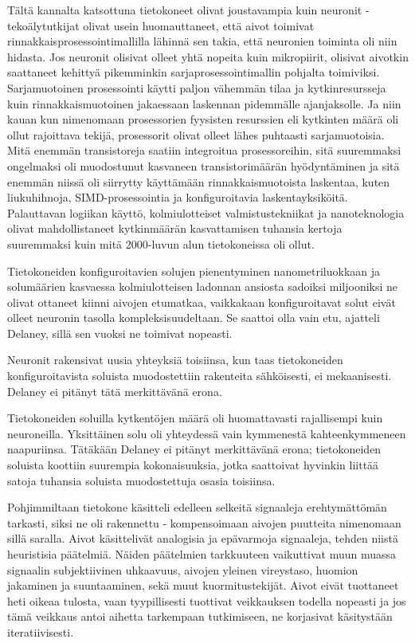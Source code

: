 Tältä kannalta katsottuna tietokoneet olivat joustavampia kuin neuronit - tekoälytutkijat olivat usein huomauttaneet, että aivot toimivat rinnakkaisprosessointimallilla lähinnä sen takia, että neuronien toiminta oli niin hidasta. Jos neuronit olisivat olleet yhtä nopeita kuin mikropiirit, olisivat aivotkin saattaneet kehittyä pikemminkin sarjaprosessointimallin pohjalta toimiviksi. Sarjamuotoinen prosessointi käytti paljon vähemmän tilaa ja kytkinresursseja kuin rinnakkaismuotoinen jakaessaan laskennan pidemmälle ajanjaksolle. Ja niin kauan kun nimenomaan prosessorien fyysisten resurssien eli kytkinten määrä oli ollut rajoittava tekijä, prosessorit olivat olleet lähes puhtaasti sarjamuotoisia. Mitä enemmän transistoreja saatiin integroitua prosessoreihin, sitä suuremmaksi ongelmaksi oli muodostunut kasvaneen transistorimäärän hyödyntäminen ja sitä enemmän niissä oli siirrytty käyttämään rinnakkaismuotoista laskentaa, kuten liukuhihnoja, SIMD-prosessointia ja konfiguroitavia laskentayksiköitä. Palauttavan logiikan käyttö, kolmiulotteiset valmistustekniikat ja nanoteknologia olivat mahdollistaneet kytkinmäärän kasvattamisen tuhansia kertoja suuremmaksi kuin mitä 2000-luvun alun tietokoneissa oli ollut.


Tietokoneiden konfiguroitavien solujen pienentyminen nanometriluokkaan ja solumäärien kasvaessa kolmiulotteisen ladonnan ansiosta sadoiksi miljooniksi ne olivat ottaneet kiinni aivojen etumatkaa, vaikkakaan konfiguroitavat solut eivät olleet neuronin tasolla kompleksisuudeltaan. Se saattoi olla vain etu, ajatteli Delaney, sillä sen vuoksi ne toimivat nopeasti.


Neuronit rakensivat uusia yhteyksiä toisiinsa, kun taas tietokoneiden konfiguroitavista soluista muodostettiin rakenteita sähköisesti, ei mekaanisesti. Delaney ei pitänyt tätä merkittävänä erona.


Tietokoneiden soluilla kytkentöjen määrä oli huomattavasti rajallisempi kuin neuroneilla. Yksittäinen solu oli yhteydessä vain kymmenestä kahteenkymmeneen naapuriinsa. Tätäkään Delaney ei pitänyt merkittävänä erona; tietokoneiden soluista koottiin suurempia kokonaisuuksia, jotka saattoivat hyvinkin liittää satoja tuhansia soluista muodostettuja osasia toisiinsa.


Pohjimmiltaan tietokone käsitteli edelleen selkeitä signaaleja erehtymättömän tarkasti, siksi ne oli rakennettu - kompensoimaan aivojen puutteita nimenomaan sillä saralla. Aivot käsittelivät analogisia ja epävarmoja signaaleja, tehden niistä heuristisia päätelmiä. Näiden päätelmien tarkkuuteen vaikuttivat muun muassa signaalin subjektiivinen uhkaavuus, aivojen yleinen vireystaso, huomion jakaminen ja suuntaaminen, sekä muut kuormitustekijät. Aivot eivät tuottaneet heti oikeaa tulosta, vaan tyypillisesti tuottivat veikkauksen todella nopeasti ja jos tämä veikkaus antoi aihetta tarkempaan tutkimiseen, ne korjasivat käsitystään iteratiivisesti.


